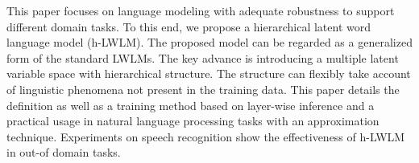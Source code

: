This paper focuses on language modeling with adequate robustness to support different domain tasks. To this end, we propose a hierarchical latent word language model (h-LWLM). The proposed model can be regarded as a generalized form of the standard LWLMs. The key advance is introducing a multiple latent variable space with hierarchical structure. The structure can flexibly take account of linguistic phenomena not present in the training data. This paper details the definition as well as a training method based on layer-wise inference and a practical usage in natural language processing tasks with an approximation technique. Experiments on speech recognition show the effectiveness of h-LWLM in out-of domain tasks.
